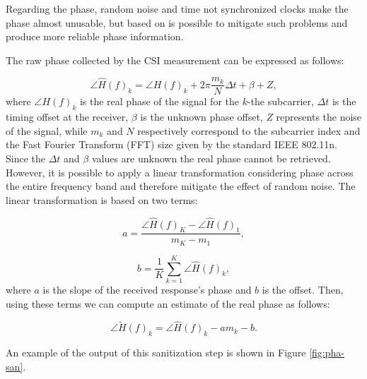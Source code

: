 \documentclass[binding=0.6cm,noexaminfo]{sapthesis}
\begin{document}
Regarding the phase, random noise and time not synchronized clocks make the phase almost unusable, but based on \cite{pads, spot, phasefi} is possible to mitigate such problems and produce more reliable phase information.

The raw phase collected by the CSI measurement can be expressed as follows:

\begin{equation}
\angle \hat{H}(f)_k = \angle H(f)_k + 2 \pi \frac{m_k}{N} \Delta t + \beta + Z,
\end{equation}
where $\angle H(f)_k$ is the real phase of the signal for the $k$-the subcarrier, $\Delta t$ is the timing offset at the receiver, $\beta$ is the unknown phase offset, $Z$ represents the noise of the signal, while $m_k$ and $N$ respectively correspond to the subcarrier index and the Fast Fourier Transform (FFT) size given by the standard IEEE 802.11n. Since the $\Delta t$ and $\beta$ values are unknown the real phase cannot be retrieved. However, it is possible to apply a linear transformation considering phase across the entire frequency band and therefore mitigate the effect of random noise.
The linear transformation is based on two terms:

\begin{equation}
a = \frac{\angle \hat{H}(f)_K - \angle \hat{H}(f)_1}{m_K - m_1},
\end{equation}

\begin{equation}
b = \frac{1}{K} \sum_{k=1}^K \angle \hat{H}(f)_k,
\end{equation}
where $a$ is the slope of the received response's phase and $b$ is the offset. Then, using these terms we can compute an estimate of the real phase as follows:

\begin{equation}
\angle \tilde{H}(f)_k = \angle \hat{H}(f)_k - a m_k - b.
\end{equation}

An example of the output of this sanitization step is shown in Figure \ref{fig:pha-san}.
\end{document}
